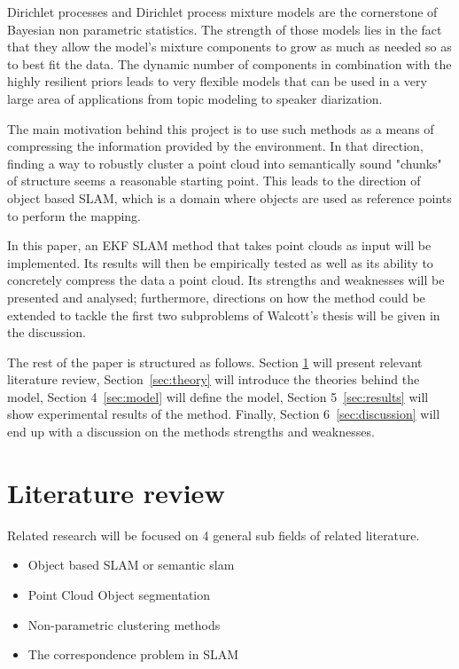 \documentclass[twoside,hidelinks]{article}
\begin{document}
Dirichlet processes and Dirichlet process mixture models \cite{nonParam} are the cornerstone of Bayesian non parametric statistics. The strength of those models lies in the fact that they allow the model's mixture components to grow as much as needed so as to best fit the data. The dynamic number of components in combination with the highly resilient priors leads to very flexible models that can be used in a very large area of applications from topic modeling\cite{LDA} to speaker diarization\cite{speakerDiar}. 

The main motivation behind this project is to use such methods as a means of compressing the information provided by the environment. In that direction, finding a way to robustly cluster a point cloud into semantically sound "chunks" of structure seems a reasonable starting point. This leads to the direction of object based SLAM, which is a domain where objects are used as reference points to perform the mapping.

In this paper, an EKF SLAM method that takes point clouds as input will be implemented. Its results will then be empirically tested as well as its ability to concretely compress the data a point cloud. Its strengths and weaknesses will be presented and analysed; furthermore, directions on how the method could be extended to tackle the first two subproblems of Walcott's thesis will be given in the discussion.

The rest of the paper is structured as follows. Section \ref{sec:literature} will present relevant literature review, Section~\ref{sec:theory} will introduce the theories behind the model, Section 4~\ref{sec:model} will define the model, Section 5~\ref{sec:results} will show experimental results of the method. Finally, Section 6~\ref{sec:discussion} will end up with a discussion on the methods strengths and weaknesses.

 
\section{Literature review}
\label{sec:literature}

Related research will be focused on 4 general sub fields of related literature.
\begin{itemize}
	\item Object based SLAM or semantic slam
	\item Point Cloud Object segmentation
	\item Non-parametric clustering methods
	\item The correspondence problem in SLAM
\end{itemize}
\end{document}
